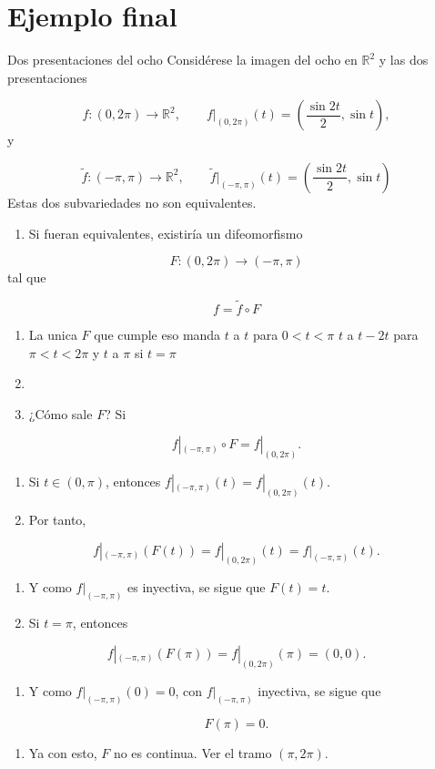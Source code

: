 \section{Ejemplo final}
\begin{bookexample}{Dos presentaciones del ocho}
Considérese la imagen del ocho en $\mathbb R^2$ y las dos presentaciones

\[
f:(0,2\pi)\to\mathbb R^2,\qquad f|_{(0,2\pi)}(t)=\left(\frac{\sin 2t}{2},\sin t\right),
\]
y

\[
\tilde f:(-\pi,\pi)\to\mathbb R^2,\qquad \tilde f|_{(-\pi,\pi)}(t)=\left(\frac{\sin 2t}{2},\sin t\right)
\]
Estas dos subvariedades no son equivalentes. 


\begin{bookremark}{}
\begin{enumerate}
\item Si fueran equivalentes, existiría un difeomorfismo
\end{enumerate}
\[
F:(0,2\pi)\to(-\pi,\pi)
\]
tal que

\[
f=\tilde f\circ F
\]
\begin{enumerate}[start=2]
\item La unica $F$ que cumple eso manda $t$ a $t$ para $0<t<\pi$ $t$ a $t-2t$ para $\pi<t<2\pi$ y $t$ a $\pi$ si $t=\pi$
\item {}
\item ¿Cómo sale $F$? Si
\end{enumerate}
\[
f|_{(-\pi,\pi)}\circ F=f|_{(0,2\pi)}.
\]
\begin{enumerate}[start=5]
\item Si $t\in(0,\pi)$, entonces $f|_{(-\pi,\pi)}(t)=f|_{(0,2\pi)}(t)$.
\item Por tanto,
\end{enumerate}
\[
f|_{(-\pi,\pi)}(F(t))=f|_{(0,2\pi)}(t)=f|_{(-\pi,\pi)}(t).
\]
\begin{enumerate}[start=7]
\item Y como $f|_{(-\pi,\pi)}$ es inyectiva, se sigue que $F(t)=t$.
\item Si $t=\pi$, entonces
\end{enumerate}
\[
f|_{(-\pi,\pi)}(F(\pi))=f|_{(0,2\pi)}(\pi)=(0,0).
\]
\begin{enumerate}[start=9]
\item Y como $f|_{(-\pi,\pi)}(0)=0$, con $f|_{(-\pi,\pi)}$ inyectiva, se sigue que
\end{enumerate}
\[
F(\pi)=0.
\]
\begin{enumerate}[start=10]
\item Ya con esto, $F$ no es continua. Ver el tramo $(\pi,2\pi)$.
\end{enumerate}
\end{bookremark}
\end{bookexample}
\label{blk:8ed2bd}
